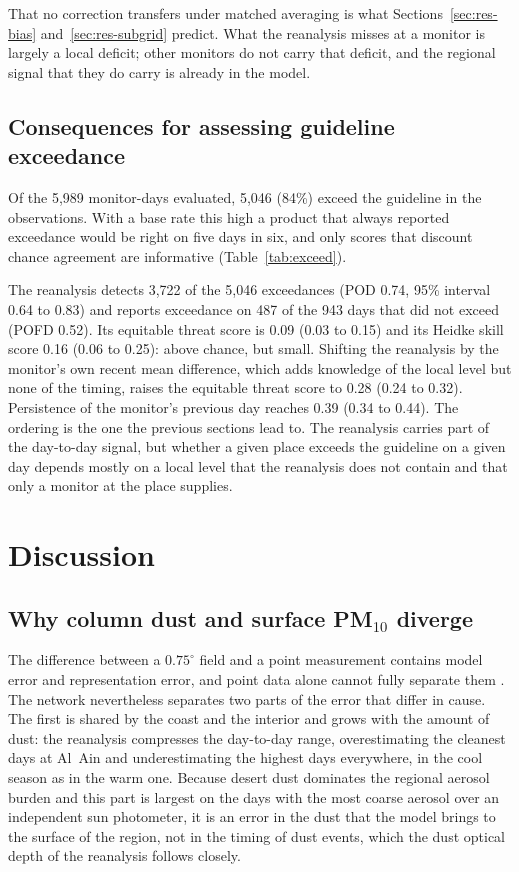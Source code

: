 That no correction transfers under matched averaging is what Sections~\ref{sec:res-bias}
and~\ref{sec:res-subgrid} predict. What the reanalysis misses at a monitor is largely a local deficit;
other monitors do not carry that deficit, and the regional signal that they do carry is already
in the model.

\subsection{Consequences for assessing guideline exceedance}
\label{sec:res-exceed}

Of the 5,989 monitor-days evaluated, 5,046 (84\%) exceed the guideline in the observations. With
a base rate this high a product that always reported exceedance would be right on five days in
six, and only scores that discount chance agreement are informative (Table~\ref{tab:exceed}).

The reanalysis detects 3,722 of the 5,046 exceedances (POD 0.74, 95\% interval 0.64 to 0.83) and
reports exceedance on 487 of the 943 days that did not exceed (POFD 0.52). Its equitable threat
score is 0.09 (0.03 to 0.15) and its Heidke skill score 0.16 (0.06 to 0.25): above chance, but
small. Shifting the reanalysis by the monitor's own recent mean difference, which adds knowledge
of the local level but none of the timing, raises the equitable threat score to 0.28 (0.24 to
0.32). Persistence of the monitor's previous day reaches 0.39 (0.34 to 0.44). The ordering is the
one the previous sections lead to. The reanalysis carries part of the day-to-day signal, but
whether a given place exceeds the guideline on a given day depends mostly on a local level that
the reanalysis does not contain and that only a monitor at the place supplies.

\section{Discussion}

\subsection{Why column dust and surface PM$_{10}$ diverge}
\label{sec:disc-column}

The difference between a $0.75^{\circ}$ field and a point measurement contains model error and
representation error, and point data alone cannot fully separate them
\citep{schutgens2016,janjic2018}. The network nevertheless separates two parts of the error that
differ in cause. The first is shared by the coast and the interior and grows with the amount of
dust: the reanalysis compresses the day-to-day range, overestimating the cleanest days at Al~Ain
and underestimating the highest days everywhere, in the cool season as in the warm one. Because
desert dust dominates the regional aerosol burden \citep{gandham2020,shahid2026} and this part is
largest on the days with the most coarse aerosol over an independent sun photometer, it is an
error in the dust that the model brings to the surface of the region, not in the timing of dust
events, which the dust optical depth of the reanalysis follows closely.

